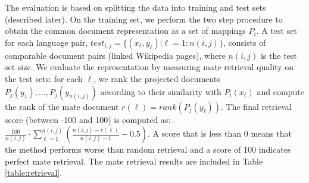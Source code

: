 \documentclass[twoside,11pt]{article}
\begin{document}
The evaluation is based on splitting the data into training and test sets (described later). On the training set, we perform the two step procedure to obtain the common document representation as a set of mappings $P_i$. A test set for each language pair, $test_{i,j} = \{(x_\ell,y_\ell) | \ell = 1:n(i,j)\} $, consists of comparable document pairs (linked Wikipedia pages), where $n(i,j)$ is the test set size. We evaluate the representation by measuring mate retrieval quality on the test sets: for each $\ell$, we rank the projected documents $P_j(y_1),\ldots, P_j(y_{n(i,j)})$ according to their similarity with $P_i(x_\ell)$ and compute the rank of the mate document $r(\ell) = rank(P_j(y_\ell))$. The final retrieval score (between -100 and 100) is computed as: $\frac{100}{n(i,j)} \cdot \sum_{\ell = 1}^{n(i,j)} \left( \frac{n(i,j) - r(\ell)}{n(i,j) -1} -0.5\right)$. A score that is less than 0 means that the method performs worse than random retrieval and a score of 100 indicates perfect mate retrieval. The mate retrieval results are included in Table \ref{table:retrieval}.
\end{document}
